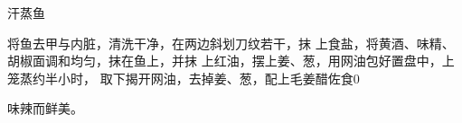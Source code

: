 \begin{recipe}{汗蒸鱼}

\ingredients



\cooking

将鱼去甲与内脏，清洗干净，在两边斜划刀纹若干，抹 上食盐，将黄酒、味精、胡椒面调和均匀，抹在鱼上，并抹 上红油，摆上姜、葱，用网油包好置盘中，上笼蒸约半小时， 取下揭开网油，去掉姜、葱，配上毛姜醋佐食0

\notes

味辣而鲜美。

\end{recipe}

